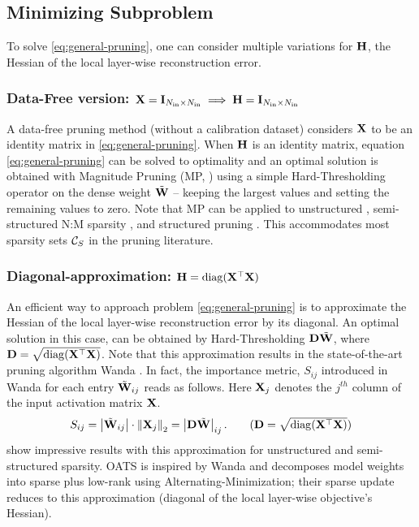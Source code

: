 \subsection{Minimizing Subproblem \Pone}\label{section-pone}
\vspace{-2pt}
To solve \eqref{eq:general-pruning}, one can consider multiple variations for $\mathbf{H}$, the Hessian of the local layer-wise reconstruction error.
\vspace{-3pt}
\subsubsection{Data-Free version: $\mathbf{X} = \mathbf{I}_{N_{\text{in}} \times N_{\text{in}}} \implies \mathbf{H} = \mathbf{I}_{N_{\text{in}} \times N_{\text{in}}}$} 
\vspace{-3pt}
A data-free pruning method (without a calibration dataset) considers $\mathbf{X}$ to be an identity matrix in \eqref{eq:general-pruning}. When $\mathbf{H}$ is an identity matrix, equation \eqref{eq:general-pruning} can be solved to optimality and an optimal solution is obtained with Magnitude Pruning (MP, \cite{han2015learning, sze2020efficient}) using a simple Hard-Thresholding operator on the dense weight $\tilde{\mathbf{W}}$ -- keeping the largest values and setting the remaining values to zero. Note that MP can be applied to unstructured \cite{han2015learning}, semi-structured N:M sparsity \cite{zhou2021learning}, and structured pruning \cite{meng2024alps}. This accommodates most sparsity sets $\mathcal{C}_S$ in the pruning literature.

\subsubsection{Diagonal-approximation: $\mathbf{H} = \operatorname{diag}({\mathbf{X}^\top\mathbf{X}})$}\label{subsection-pruning-diagonal-approximation}
\vspace{-3pt}
An efficient way to approach problem \eqref{eq:general-pruning} is to approximate the Hessian of the local layer-wise reconstruction error by its diagonal. An optimal solution in this case, can be obtained by Hard-Thresholding $\mathbf{D} \tilde{\mathbf{W}}$, where $\mathbf{D} = \sqrt{\operatorname{diag}({\mathbf{X}^\top\mathbf{X}})}$. Note that this approximation results in the state-of-the-art pruning algorithm Wanda \cite{sun2023simple}. In fact, the importance metric, $S_{ij}$ introduced in Wanda for each entry $\tilde{\mathbf{W}}_{ij}$ reads as follows. Here $\mathbf{X}_j$ denotes the $j^{th}$ column of the input activation matrix $\mathbf{X}$.
\begin{equation}\label{eq:wanda-metric}
    S_{ij} = \abs{\pruningW_{ij}} \cdot \norm{\bfX_j}_2 = \abs{\bfD \pruningW}_{ij}. \tag{$\bfD = \sqrt{\diagn{\bfXTX}}$}
\end{equation}
\citet{sun2023simple} show impressive results with this approximation for unstructured and semi-structured sparsity. OATS \cite{zhang2024oats} is inspired by Wanda and decomposes model weights into sparse plus low-rank using Alternating-Minimization; their sparse update reduces to this approximation (diagonal of the local layer-wise objective's Hessian).
\vspace{-3pt}
